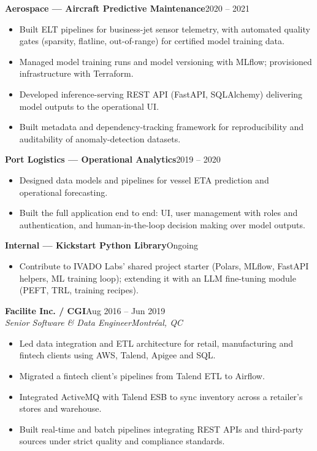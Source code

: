 \documentclass[10pt,letterpaper]{article}
\newcommand{\job}[4]{\textbf{#1}\hfill #4\\ \textit{#2}\hfill\textit{#3}\par\vspace{2pt}}
\newcommand{\project}[3]{\Needspace{6\baselineskip}\vspace{4pt}\textbf{#1}\ifstrempty{#2}{}{ \textit{(#2)}}\hfill #3\par}
\begin{document}
\project{Aerospace --- Aircraft Predictive Maintenance}{}{2020 -- 2021}
\begin{itemize}
\item Built ELT pipelines for business-jet sensor telemetry, with automated quality gates (sparsity, flatline, out-of-range) for certified model training data.
\item Managed model training runs and model versioning with MLflow; provisioned infrastructure with Terraform.
\item Developed inference-serving REST API (FastAPI, SQLAlchemy) delivering model outputs to the operational UI.
\item Built metadata and dependency-tracking framework for reproducibility and auditability of anomaly-detection datasets.
\end{itemize}

\project{Port Logistics --- Operational Analytics}{}{2019 -- 2020}
\begin{itemize}
\item Designed data models and pipelines for vessel ETA prediction and operational forecasting.
\item Built the full application end to end: UI, user management with roles and authentication, and human-in-the-loop decision making over model outputs.
\end{itemize}

\project{Internal --- Kickstart Python Library}{}{Ongoing}
\begin{itemize}
\item Contribute to IVADO Labs' shared project starter (Polars, MLflow, FastAPI helpers, ML training loop); extending it with an LLM fine-tuning module (PEFT, TRL, training recipes).
\end{itemize}

\vspace{6pt}
\job{Facilite Inc. / CGI}{Senior Software \& Data Engineer}{Montréal, QC}{Aug 2016 -- Jun 2019}
\begin{itemize}
\item Led data integration and ETL architecture for retail, manufacturing and fintech clients using AWS, Talend, Apigee and SQL.
\item Migrated a fintech client's pipelines from Talend ETL to Airflow.
\item Integrated ActiveMQ with Talend ESB to sync inventory across a retailer's stores and warehouse.
\item Built real-time and batch pipelines integrating REST APIs and third-party sources under strict quality and compliance standards.
\end{itemize}
\end{document}
